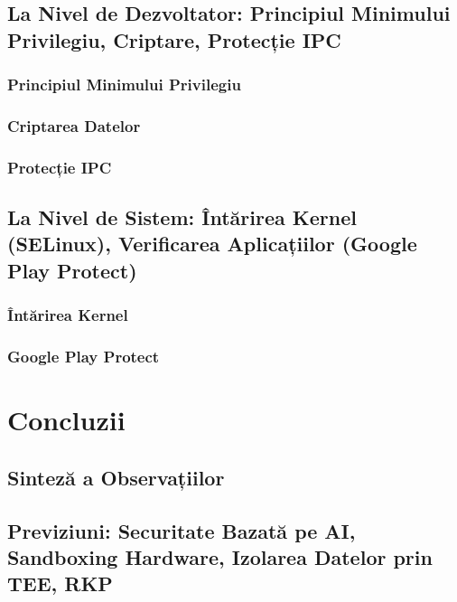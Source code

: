 \documentclass[11pt,a4paper,twocolumn]{article}
\theoremstyle{definition}
\theoremstyle{plain}
\theoremstyle{remark}
\begin{document}
\subsection{La Nivel de Dezvoltator: Principiul Minimului Privilegiu, Criptare, Protecție IPC}

\subsubsection{Principiul Minimului Privilegiu}

\subsubsection{Criptarea Datelor}

\subsubsection{Protecție IPC}

\subsection{La Nivel de Sistem: Întărirea Kernel (SELinux), Verificarea Aplicațiilor (Google Play Protect)}

\subsubsection{Întărirea Kernel}

\subsubsection{Google Play Protect}

\section{Concluzii}

\subsection{Sinteză a Observațiilor}

\subsection{Previziuni: Securitate Bazată pe AI, Sandboxing Hardware, Izolarea Datelor prin TEE, RKP}
\end{document}
